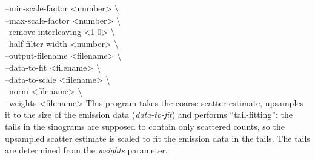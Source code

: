 \documentclass{article}
\begin{document}
{{					--min-scale-factor <number> \textbackslash \\
					--max-scale-factor <number> \textbackslash \\
					--remove-interleaving <1|0> \textbackslash \\
					--half-filter-width <number> \textbackslash \\
					--output-filename <filename> \textbackslash \\
					--data-to-fit <filename> \textbackslash \\
					--data-to-scale <filename> \textbackslash \\
					--norm <filename> \textbackslash \\
					--weights <filename>%
}
This program takes the coarse scatter estimate, upsamples it to the size of the emission data (\textit{data-to-fit}) and 
performs ``tail-fitting'': the tails in the sinograms are supposed to contain only scattered counts, so the upsampled
scatter estimate is scaled to fit the emission data in the tails. The tails are determined from the \textit{weights}
parameter.

}
\end{document}
